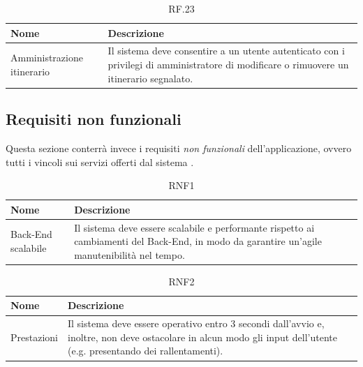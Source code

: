 \documentclass{natourDoc}
\begin{document}
\begin{table}[H]
	\centering
	\begin{tabular}{ |p{5cm}|p{10.3cm}| }
		\hline
		\rowcolor{PineGreen!70}
		\textbf{Nome}              & \textbf{Descrizione}                                                                                \\
		\hline
		Amministrazione itinerario & Il sistema deve consentire a un utente autenticato con i privilegi di amministratore di modificare o
		rimuovere un itinerario segnalato.                                                                                               \\
		\hline
	\end{tabular}
	\caption{RF.23}
\end{table}

\newpage
\subsection{Requisiti non funzionali}
Questa sezione conterrà invece i requisiti \textit{non funzionali} dell'applicazione, ovvero tutti i vincoli sui servizi offerti dal sistema .

\begin{table}[H]
	\centering
	\begin{tabular}{ |p{5cm}|p{10.3cm}| }
		\hline
		\rowcolor{PineGreen!70}
		\textbf{Nome}      & \textbf{Descrizione}                                                                 \\
		\hline
		Back-End scalabile & Il sistema deve essere scalabile e performante rispetto ai cambiamenti del Back-End,
		in modo da garantire un'agile manutenibilità nel tempo.                                                   \\
		\hline
	\end{tabular}
	\caption{RNF1}
\end{table}

\begin{table}[H]
	\centering
	\begin{tabular}{ |p{5cm}|p{10.3cm}| }
		\hline
		\rowcolor{PineGreen!70}
		\textbf{Nome} & \textbf{Descrizione}                                                                           \\
		\hline
		Prestazioni   & Il sistema deve essere operativo entro 3 secondi dall'avvio e, inoltre, non deve ostacolare in
		alcun modo gli input dell'utente (e.g. presentando dei rallentamenti).                                         \\
		\hline
	\end{tabular}
	\caption{RNF2}
\end{table}
\end{document}
